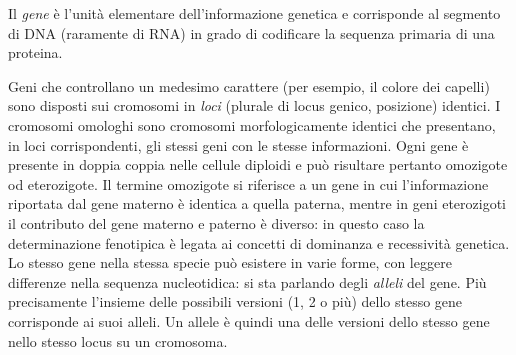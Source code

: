 Il \textit{gene} è l'unità elementare dell'informazione genetica e corrisponde al segmento di DNA (raramente di RNA) in grado di codificare la sequenza primaria di una proteina.  


Geni che controllano un medesimo carattere (per esempio, il colore dei capelli) sono disposti sui cromosomi in \textit{loci} (plurale di locus genico, posizione) identici. I cromosomi omologhi sono cromosomi morfologicamente identici che presentano, in loci corrispondenti, gli stessi geni con le stesse informazioni. Ogni gene è presente in doppia coppia nelle cellule diploidi e può risultare pertanto omozigote od eterozigote.  Il termine omozigote si riferisce a un gene in cui l'informazione riportata dal gene materno è identica a quella paterna, mentre in geni eterozigoti il contributo del gene materno e paterno è diverso: in questo caso la determinazione fenotipica è legata ai concetti di dominanza e recessività genetica. Lo stesso gene nella stessa specie può esistere in varie forme, con leggere differenze nella sequenza nucleotidica: si sta parlando degli \textit{alleli} del gene. Più precisamente l'insieme delle possibili versioni (1, 2 o più) dello stesso gene corrisponde ai suoi alleli. Un allele è quindi una delle versioni dello stesso gene nello stesso locus su un cromosoma.

